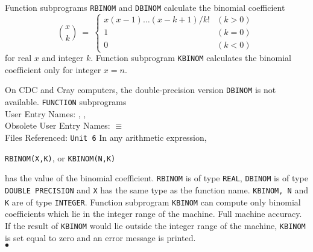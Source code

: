                      
              
\Submitter{}                        
                  
Function subprograms {\tt RBINOM} and {\tt DBINOM} calculate
the binomial coefficient
$$ \binom{x}{k} \ = \ \left\{ \begin{array}{ll}
 x(x-1)\ldots(x-k+1)/k! & (k>0) \\
 1                      & (k=0) \\
 0                      & (k<0) \
\end{array} \right.$$
for real $x$ and integer $k$.
Function subprogram {\tt KBINOM} calculates the
binomial coefficient only for integer $x=n$.
\par
On CDC and Cray computers, the double-precision version
{\tt DBINOM} is not available.
\Structure
{\tt FUNCTION} subprograms \\
User Entry  Names: , ,  \\
Obsolete User Entry Names: \Rdef{BINOM} $\equiv$ \Rdef{RBINOM} \\
Files Referenced: {\tt Unit 6}
\Usage
In any arithmetic expression,
\begin{center}
{\tt RBINOM(X,K)},  \quad or \quad
{\tt KBINOM(N,K)}
\end{center}
has the value of the binomial coefficient. {\tt RBINOM} is of type
{\tt REAL}, {\tt DBINOM} is of type {\tt DOUBLE PRECISION}
and {\tt X} has the
same type as the function name. {\tt KBINOM, N} and {\tt K} are of type
{\tt INTEGER}.
\Restrict
Function subprogram {\tt KBINOM} can compute only binomial
coefficients which lie in the integer range of the machine.
\Accuracy
Full machine accuracy.
\Errorh
If the result of {\tt KBINOM} would lie outside the integer range of
the machine, {\tt KBINOM} is set equal to zero and an error
message is printed.
\\ $\bullet$

